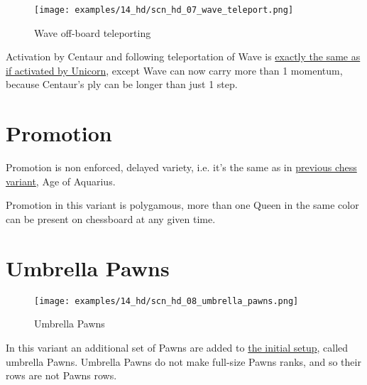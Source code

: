 \vspace*{-1.2\baselineskip}
\noindent
\begin{figure}[!h]
\texttt{[image: examples/14\_hd/scn\_hd\_07\_wave\_teleport.png]}
\caption{Wave off-board teleporting}
\label{fig:scn_hd_07_wave_teleport}
\end{figure}

Activation by Centaur and following teleportation of Wave is
\hyperref[fig:scn_n_07_teleport_wave_init]{exactly the same as if activated by Unicorn},
except Wave can now carry more than 1 momentum, because Centaur's ply can be
longer than just 1 step.

\clearpage %

\section*{Promotion}

Promotion is non enforced, delayed variety, i.e. it's the same as in
\hyperref[sec:Age of Aquarius/Promotion]{previous chess variant}, Age of Aquarius.

Promotion in this variant is polygamous, more than one Queen in the same color
can be present on chessboard at any given time.

\clearpage %

\section*{Umbrella Pawns}

\vspace*{-1.2\baselineskip}
\noindent
\begin{figure}[!h]
\texttt{[image: examples/14\_hd/scn\_hd\_08\_umbrella\_pawns.png]}
\caption{Umbrella Pawns}
\label{fig:scn_hd_08_umbrella_pawns}
\end{figure}

In this variant an additional set of Pawns are added to \hyperref[fig:14_hemera_s_dawn]{the initial setup},
called umbrella Pawns. Umbrella Pawns do not make full-size Pawns ranks, and so their rows are not Pawns rows.

